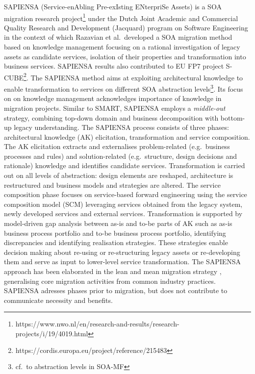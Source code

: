 SAPIENSA (Service-enAbling Pre-exIsting ENterpriSe Assets) \autocite{Razavian2010SAPIENSA,Razavian2013PHD,Razavian2012,Razavian2014a,Razavian2009} is a SOA migration research project\footnote{https://www.nwo.nl/en/research-and-results/research-projects/i/19/4019.html} under the Dutch Joint Academic and Commercial Quality Research and Development (Jacquard) program on Software Engineering in the context of which Razavian et al.~developed a SOA migration method based on knowledge management focusing on a rational investigation of legacy assets as candidate services, isolation of their properties and transformation into business services.
SAPIENSA results also contributed to EU FP7 project S-CUBE\footnote{https://cordis.europa.eu/project/reference/215483}.
The SAPIENSA method aims at exploiting architectural knowledge to enable transformation to services on different SOA abstraction levels\footnote{cf.~to abstraction levels in SOA-MF}.
Its focus on on knowledge management acknowledges importance of knowledge in migration projects.
Similar to SMART, SAPIENSA employs a \emph{middle-out} strategy, combining top-down domain and business decomposition with bottom-up legacy understanding.
The SAPIENSA process consists of three phases: architectural knowledge (AK) elicitation, transformation and service composition.
The AK elicitation extracts and externalises problem-related (e.g.~business processes and rules) and solution-related (e.g.~structure, design decisions and rationale) knowledge and identifies candidate services.
Transformation is carried out on all levels of abstraction: design elements are reshaped, architecture is restructured and business models and strategies are altered.
The service composition phase focuses on service-based forward engineering using the service composition model (SCM) leveraging services obtained from the legacy system, newly developed services and external services.
Transformation is supported by model-driven gap analysis \autocite{Nguyen2009} between as-is and to-be parts of AK such as as-is business process portfolio and to-be business process portfolio, identifying discrepancies and identifying realisation strategies.
These strategies enable decision making about re-using or re-structuring legacy assets or re-developing them and serve as input to lower-level service transformation.
The SAPIENSA approach has been elaborated in the lean and mean migration strategy \autocite{Razavian2012,Razavian2014a}, generalising core migration activities from common industry practices.
SAPIENSA adresses phases prior to migration, but does not contribute to communicate necessity and benefits.
